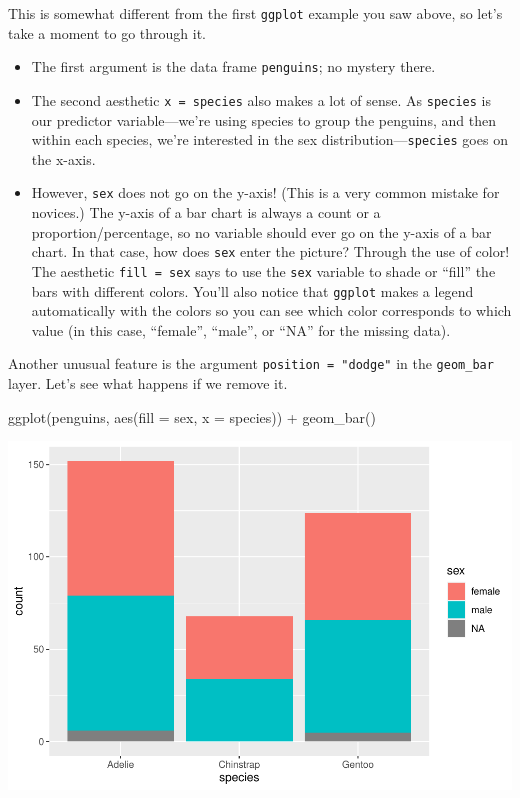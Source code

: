 \documentclass[
]{book}
\newenvironment{Shaded}{\begin{snugshade}}{\end{snugshade}}
\newcommand{\AttributeTok}[1]{\textcolor[rgb]{0.77,0.63,0.00}{#1}}
\newcommand{\FunctionTok}[1]{\textcolor[rgb]{0.00,0.00,0.00}{#1}}
\newcommand{\NormalTok}[1]{#1}
\newcommand{\SpecialCharTok}[1]{\textcolor[rgb]{0.00,0.00,0.00}{#1}}
\providecommand{\tightlist}{%
  \setlength{\itemsep}{0pt}\setlength{\parskip}{0pt}}
\begin{document}
This is somewhat different from the first \texttt{ggplot} example you saw above, so let's take a moment to go through it.

\begin{itemize}
\tightlist
\item
  The first argument is the data frame \texttt{penguins}; no mystery there.
\item
  The second aesthetic \texttt{x\ =\ species} also makes a lot of sense. As \texttt{species} is our predictor variable---we're using species to group the penguins, and then within each species, we're interested in the sex distribution---\texttt{species} goes on the x-axis.
\item
  However, \texttt{sex} does not go on the y-axis! (This is a very common mistake for novices.) The y-axis of a bar chart is always a count or a proportion/percentage, so no variable should ever go on the y-axis of a bar chart. In that case, how does \texttt{sex} enter the picture? Through the use of color! The aesthetic \texttt{fill\ =\ sex} says to use the \texttt{sex} variable to shade or ``fill'' the bars with different colors. You'll also notice that \texttt{ggplot} makes a legend automatically with the colors so you can see which color corresponds to which value (in this case, ``female'', ``male'', or ``NA'' for the missing data).
\end{itemize}

Another unusual feature is the argument \texttt{position\ =\ "dodge"} in the \texttt{geom\_bar} layer. Let's see what happens if we remove it.

\begin{Shaded}
\begin{Highlighting}[]
\FunctionTok{ggplot}\NormalTok{(penguins, }\FunctionTok{aes}\NormalTok{(}\AttributeTok{fill =}\NormalTok{ sex, }\AttributeTok{x =}\NormalTok{ species)) }\SpecialCharTok{+} 
    \FunctionTok{geom\_bar}\NormalTok{()}
\end{Highlighting}
\end{Shaded}

\includegraphics{intro_stats_files/figure-latex/unnamed-chunk-60-1.pdf}
\end{document}
